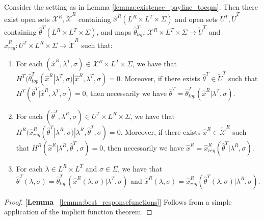 \begin{lemma}\label{lemma:best_responsefunctions}
Consider the setting as in Lemma \ref{lemma:existence_payline_toeqm}. Then there exist open sets $\mathcal{X}^R, \tilde{\mathcal{X}}^R$ containing $\hat{x}^R(L^R\times L^T\times \Sigma)$ and open sets $U^T,\tilde{U}^T$ containing $\hat{\theta}^T(L^R\times L^T\times \Sigma)$, and maps $\hat{\theta}^T_{top}:\mathcal{X}^R\times L^T\times \Sigma\rightarrow \tilde{U}^T$ and $\hat{x}^R_{reg}:U^T\times L^R\times \Sigma\rightarrow \tilde{\mathcal{X}}^R$ such that:
\vspace{-5pt}
\begin{enumerate}[label=(\arabic*),ref=\thelemma(\arabic*)]
   \item For each $(\hat{x}^R,\lambda^T,\sigma)\in \mathcal{X}^R\times L^T\times \Sigma$, we have that $H^T(\hat{\theta}^T_{top}(\hat{x}^R|\lambda^T,\sigma)|\hat{x}^R,\lambda^T,\sigma)=0$. Moreover, if there exists $\hat{\theta}^T\in \tilde{U}^T$ such that $H^T(\hat{\theta}^T|\hat{x}^R,\lambda^T,\sigma) = 0$, then necessarily we have $\hat{\theta}^T = \hat{\theta}^T_{top}(\hat{x}^R|\lambda^T,\sigma)$. 
   \item For each $(\hat{\theta}^T,\lambda^R,\sigma)\in U^T\times L^R\times \Sigma$, we have that $H^R(\hat{x}^R_{reg}(\hat{\theta}^T|\lambda^R,\sigma)|\lambda^R,\hat{\theta}^T,\sigma) = 0$. Moreover, if there exists $\hat{x}^R\in \tilde{\mathcal{X}}^R$ such that $H^R(\hat{x}^R|\lambda^R,\hat{\theta}^T,\sigma) = 0$, then necessarily we have $\hat{x}^R = \hat{x}^R_{reg}(\hat{\theta}^T|\lambda^R,\sigma)$. 
   \item For each $\lambda\in L^R\times L^T$ and $\sigma\in \Sigma$, we have that $\hat{\theta}^T(\lambda,\sigma) = \hat{\theta}^T_{top}(\hat{x}^R(\lambda,\sigma)|\lambda^T,\sigma)$ and $\hat{x}^R(\lambda,\sigma) = \hat{x}^R_{reg}(\hat{\theta}^T(\lambda,\sigma)|\lambda^R,\sigma)$. 
\end{enumerate}
\end{lemma}

\begin{proof}{[\textbf{Lemma} ~\ref{lemma:best_responsefunctions}]} Follows from a simple application of the implicit function theorem. 
\end{proof}

